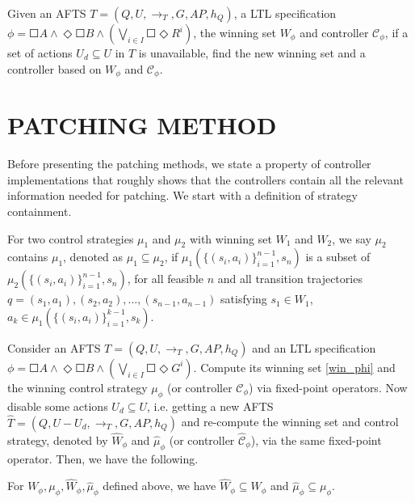 \begin{problem}
	Given an AFTS $ T = (Q,U,\rightarrow_T,G,AP,h_Q) $, a LTL specification $ \phi = \Square A \wedge \Diamond \Square B \wedge \left( \bigvee_{i\in I} \Square \Diamond R^i\right) $, the winning set $ W_{\phi} $ and controller $ \mathcal{C}_{\phi} $, if a set of actions $ U_d\subseteq U $ in $ T $ is unavailable, find the new winning set and a controller based on $ W_{\phi} $ and $ \mathcal{C}_{\phi} $.
\end{problem}


\section{PATCHING METHOD}
\label{sec:method}

Before presenting the patching methods, we state a property of controller implementations that roughly shows that the controllers contain all the relevant information needed for patching. We start with a definition of strategy containment.

\begin{definition}
	For two control strategies $ \mu_1 $ and $ \mu_2 $ with winning set $ W_1 $ and $ W_2 $, we say $ \mu_2 $ contains $ \mu_1$, denoted as $ \mu_{1} \subseteq \mu_{2}$, if $ \mu_{1} (\{(s_i,a_i)\}_{i=1}^{n-1}, s_n) $ is a subset of $ \mu_{2}(\{(s_i,a_i)\}_{i=1}^{n-1}, s_n) $, for all feasible $ n $ and all transition trajectories $ q =(s_1,a_1),(s_2,a_2),...,(s_{n-1},a_{n-1}) $ satisfying $ s_1\in W_{1} $, $ a_k \in \mu_{1} (\{(s_i,a_i)\}_{i=1}^{k-1}, s_k) $.
\end{definition}

Consider an AFTS $ T = (Q,U,\rightarrow_T,G,AP,h_Q) $ and {\color{blue} an} LTL specification $ \phi = \Square A \wedge \Diamond \Square B \wedge \left( \bigvee_{i\in I} \Square \Diamond G^i\right) $. Compute its winning set \eqref{win_phi} and the winning control strategy $ \mu_{\phi} $ (or controller $ \mathcal{C}_{\phi} $) via fixed-point operators. Now disable some actions $ U_d \subseteq U$, i.e. getting a new AFTS $ \widehat{T} = (Q,U-U_d,\rightarrow_T,G,AP,h_Q) $ and re-compute the winning set and control strategy, denoted by $ \widehat{W}_{\phi} $ and $ \widehat{\mu}_{\phi} $ (or controller $ \widehat{\mathcal{C}}_{\phi} $), via the same fixed-point operator. Then, we have the following.



\begin{theorem}
	For $ W_{\phi}, \mu_{\phi}, \widehat{W}_{\phi}, \widehat{\mu}_{\phi} $ defined above, we have $ \widehat{W}_{\phi} \subseteq W_{\phi}  $ and $ \widehat{\mu}_{\phi} \subseteq \mu_{\phi}$\label{thm: 1}.
\end{theorem}

